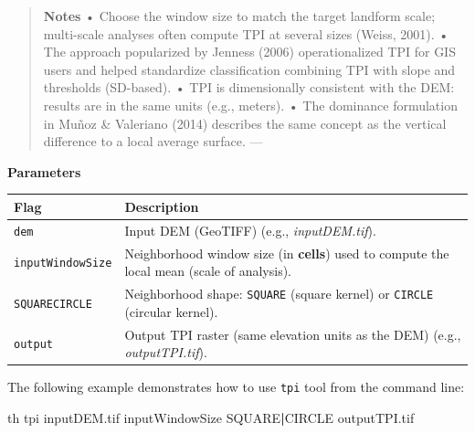 \documentclass[
]{book}
\newenvironment{Shaded}{\begin{snugshade}}{\end{snugshade}}
\newcommand{\ExtensionTok}[1]{#1}
\newcommand{\KeywordTok}[1]{\textcolor[rgb]{0.13,0.29,0.53}{\textbf{#1}}}
\newcommand{\NormalTok}[1]{#1}
\begin{document}
\begin{quote}
\textbf{Notes}
• Choose the window size to match the target landform scale; multi-scale analyses often compute TPI at several sizes (Weiss, 2001).
• The approach popularized by Jenness (2006) operationalized TPI for GIS users and helped standardize classification combining TPI with slope and thresholds (SD-based).
• TPI is dimensionally consistent with the DEM: results are in the same units (e.g., meters).
• The dominance formulation in Muñoz \& Valeriano (2014) describes the same concept as the vertical difference to a local average surface.
---
\end{quote}

\textbf{Parameters}

\begin{longtable}[]{@{}
  >{\raggedright\arraybackslash}p{}
  >{\raggedright\arraybackslash}p{}@{}}
\toprule\noalign{}
\begin{minipage}[b]{\linewidth}\raggedright
Flag
\end{minipage} & \begin{minipage}[b]{\linewidth}\raggedright
Description
\end{minipage} \\
\midrule\noalign{}
\endhead
\bottomrule\noalign{}
\endlastfoot
\texttt{dem} & Input DEM (GeoTIFF) (e.g., \emph{inputDEM.tif}). \\
\texttt{inputWindowSize} & Neighborhood window size (in \textbf{cells}) used to compute the local mean (scale of analysis). \\
\texttt{SQUARE\textbar{}CIRCLE} & Neighborhood shape: \texttt{SQUARE} (square kernel) or \texttt{CIRCLE} (circular kernel). \\
\texttt{output} & Output TPI raster (same elevation units as the DEM) (e.g., \emph{outputTPI.tif}). \\
\end{longtable}

The following example demonstrates how to use \texttt{tpi} tool from the command line:

\begin{Shaded}
\begin{Highlighting}[]
\ExtensionTok{th}\NormalTok{ tpi inputDEM.tif inputWindowSize SQUARE}\KeywordTok{|}\ExtensionTok{CIRCLE}\NormalTok{ outputTPI.tif}
\end{Highlighting}
\end{Shaded}
\end{document}
